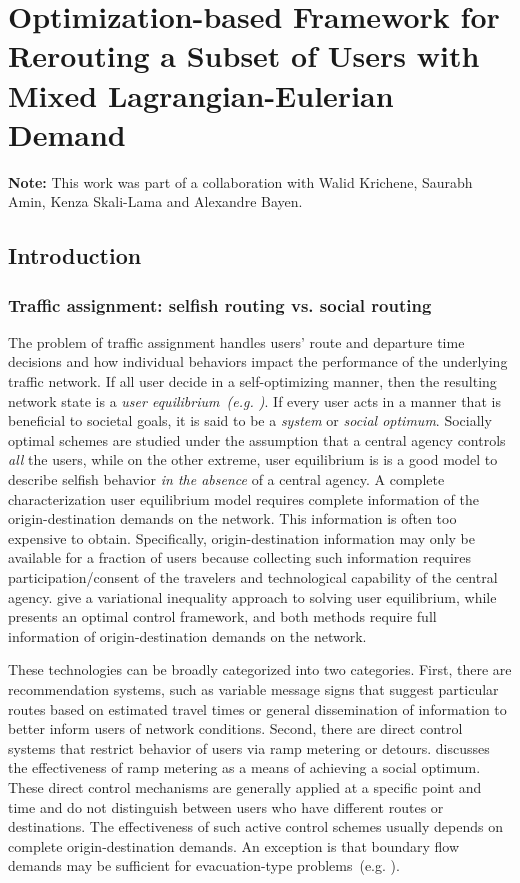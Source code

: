 \chapter{Optimization-based Framework for Rerouting a Subset of Users with Mixed Lagrangian-Eulerian Demand}
\label{chapter:le}

\textbf{Note: } This work was part of a collaboration with Walid Krichene, Saurabh Amin, Kenza Skali-Lama and Alexandre Bayen. 

\section{Introduction}
\label{sec:le:introduction}


\subsection{Traffic assignment: selfish routing vs. social routing\label{sub:Traffic-assignment:-selfish}}

The problem of traffic assignment handles users' route and departure
time decisions and how individual behaviors impact the performance
of the underlying traffic network. If all user decide in a self-optimizing
manner, then the resulting network state is a \emph{user equilibrium~(e.g.
\cite{wardrop1952some})}. If every user acts in a manner that
is beneficial to societal goals, it is said to be a \emph{system}
or \emph{social optimum}. Socially optimal schemes are studied under
the assumption that a central agency controls \emph{all }the users,
while on the other extreme, user equilibrium is is a good model to
describe selfish behavior \emph{in the absence} of a central agency.
A complete characterization user equilibrium model requires complete
information of the origin-destination demands on the network. This
information is often too expensive to obtain. Specifically, origin-destination
information may only be available for a fraction of users because
collecting such information requires participation/consent of the
travelers and technological capability of the central agency. \cite{lo2002cell}
give a variational inequality approach to solving user equilibrium,
while \cite{papageogiou1990} presents an optimal control framework,
and both methods require full information of origin-destination demands
on the network.

These technologies can be broadly categorized into two categories.
First, there are recommendation systems, such as variable message
signs that suggest particular routes based on estimated travel times
or general dissemination of information to better inform users of
network conditions. Second, there are direct control systems that
restrict behavior of users via ramp metering or detours. \cite{gomes2008behavior}
discusses the effectiveness of ramp metering as a means of achieving
a social optimum. These direct control mechanisms are generally applied
at a specific point and time and do not distinguish between users
who have different routes or destinations. The effectiveness of such
active control schemes usually depends on complete origin-destination
demands. An exception is that boundary flow demands may be sufficient
for evacuation-type problems~(e.g. \cite{ziliaskopoulos2000linear}).


